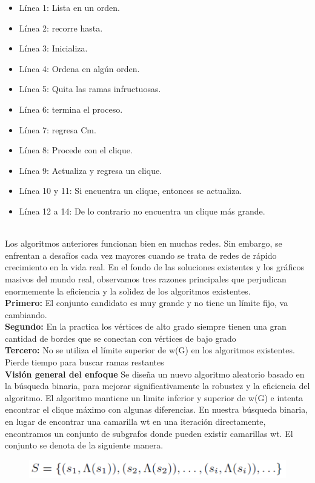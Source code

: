 \begin{itemize}
    \item Línea 1: Lista en un orden.
    \item Línea 2: recorre hasta.
    \item Línea 3: Inicializa.
    \item Línea 4: Ordena en algún orden.
    \item Línea 5: Quita las ramas infructuosas.
    \item Línea 6: termina el proceso.
    \item Línea 7: regresa Cm.
    \item Línea 8: Procede con el clique.
    \item Línea 9: Actualiza y regresa un clique.
    \item Línea 10 y 11: Si encuentra un clique, entonces se actualiza.
    \item Línea 12 a 14: De lo contrario no encuentra un clique más grande.
\end{itemize}
\\
Los algoritmos anteriores funcionan bien en muchas redes. Sin embargo, se enfrentan a desafíos cada vez mayores cuando se trata de redes de rápido crecimiento en la vida real. En el fondo de las soluciones existentes y los gráficos masivos del mundo real, observamos tres razones principales que perjudican enormemente la eficiencia y la solidez de los algoritmos existentes.
\\
\textbf{Primero:} El conjunto candidato es muy grande y no tiene un límite fijo, va cambiando.
\\
\textbf{Segundo:} En la practica los vértices de alto grado siempre tienen una gran cantidad de bordes que se conectan con vértices de bajo grado
\\
\textbf{Tercero:} No se utiliza el límite superior de w(G) en los algoritmos existentes. Pierde tiempo para buscar ramas restantes
\\
\textbf{Visión general del enfoque}
Se diseña un nuevo algoritmo aleatorio basado en la búsqueda binaria, para mejorar significativamente la robustez y la eficiencia del algoritmo. El algoritmo mantiene un limite inferior y superior de w(G) e intenta encontrar el clique máximo con algunas diferencias. 
En nuestra búsqueda binaria, en lugar de encontrar una camarilla wt en una iteración directamente, encontramos un conjunto de subgrafos donde pueden existir camarillas wt. El conjunto se denota de la siguiente manera.
\\
\begin{figure}[h!]
\centering
\includegraphics[scale=1]{img/imagen2.png}
\label{Comandos}
\end{figure}
